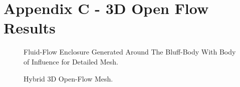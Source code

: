 \newpage
\section*{Appendix C - 3D Open Flow Results} 

\begin{figure}[!htb]
    \centering
    \noindent{}
    \caption{Fluid-Flow Enclosure Generated Around The Bluff-Body With Body of Influence for Detailed Mesh.}
    \label{fig:3D_OF_FLOWFIELD}
\end{figure}

\begin{figure}[!htb]
    \centering
    \noindent{}
    \caption{Hybrid 3D Open-Flow Mesh.}
    \label{fig:3D_OF_MESH}
\end{figure}

